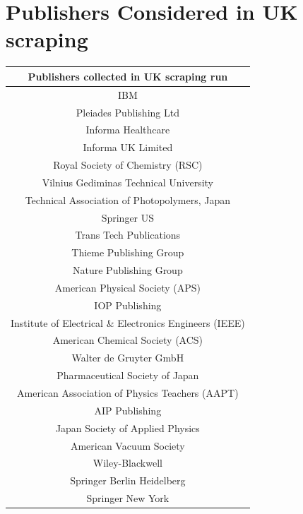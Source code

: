 \section{Publishers Considered in UK scraping}
\begin{table}[H]
\centering
\begin{tabular}{||c||}
\hline
Publishers collected in UK scraping run \\
\hline 
IBM                                               \\
Pleiades Publishing Ltd                           \\
Informa Healthcare                                \\
Informa UK Limited                                \\
Royal Society of Chemistry (RSC)                  \\
Vilnius Gediminas Technical University            \\
Technical Association of Photopolymers, Japan     \\
Springer US                                       \\
Trans Tech Publications                           \\
Thieme Publishing Group                           \\
Nature Publishing Group                           \\
American Physical Society (APS)                   \\
IOP Publishing                                    \\
Institute of Electrical \& Electronics Engineers (IEEE)\\
American Chemical Society (ACS)                   \\
Walter de Gruyter GmbH                            \\
Pharmaceutical Society of Japan                   \\
American Association of Physics Teachers (AAPT)   \\
AIP Publishing                                    \\
Japan Society of Applied Physics                  \\
American Vacuum Society                           \\
Wiley-Blackwell                                   \\
Springer Berlin Heidelberg                        \\
Springer New York                                 \\

\end{tabular}
\end{table}
